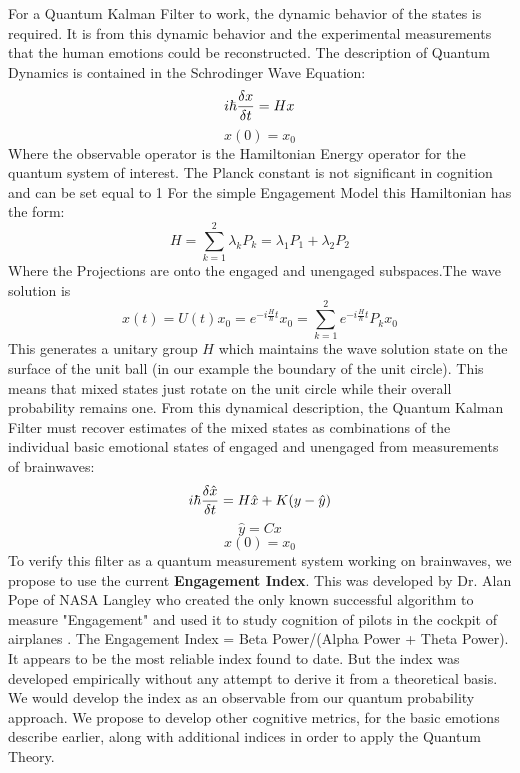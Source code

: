 For a Quantum Kalman Filter to work, the dynamic behavior of the states is required. It is from this dynamic behavior and the experimental measurements that the human emotions could be reconstructed. The description of Quantum Dynamics is contained in the Schrodinger Wave Equation: 
\begin{equation}
i \hbar \frac{\delta x}{\delta t}=Hx\\
\end{equation}
\begin{equation}
x(0)=x_0
\end{equation}
Where the observable operator   is the Hamiltonian Energy operator for the quantum system of interest. The Planck constant is not significant in cognition and can be set equal to 1 
For the simple Engagement Model this Hamiltonian has the form: 
\begin{equation}
H=\sum_{k=1}^2 \lambda_k P_k=\lambda_1 P_1+ \lambda_2 P_2
\end{equation}
Where the Projections are onto the engaged and unengaged subspaces.The wave solution is
\begin{equation}
x(t)=U(t)x_0=e^{-i\frac{H}{\hbar}t}x_0=\sum_{k=1}^{2} e^{-i\frac{H}{\hbar}t} P_k x_0
\end{equation}
This generates a unitary group $H$ which maintains the wave solution state on the surface of the unit ball (in our example the boundary of the unit circle).  This means that mixed states just rotate on the unit circle while their overall probability remains one. From this dynamical description, the Quantum Kalman Filter must recover estimates of the mixed states as combinations of the individual basic emotional states of engaged and unengaged from measurements of brainwaves:
\begin{equation}
i \hbar \frac{\delta \hat{x}}{\delta t}=H \hat{x}+K(y-\hat{y})\\
\end{equation}
\begin{equation}
\hat{y}=Cx
\end{equation}
\begin{equation}
x(0)=x_0
\end{equation}
To verify this filter as a quantum measurement system working on brainwaves, we propose to use the current \textbf{Engagement Index}. This was developed by Dr. Alan Pope of NASA Langley who created the only known successful algorithm to measure "Engagement" and used it to study cognition of pilots in the cockpit of airplanes \cite{Pope1995}  . The Engagement Index = Beta Power/(Alpha Power + Theta Power). It appears to be the most reliable index found to date. But the index was developed empirically without any attempt to derive it from a theoretical basis. We would develop the index as an observable from our quantum probability approach. We propose to develop other cognitive metrics, for the basic emotions describe earlier, along with additional indices in order to apply the Quantum Theory.

